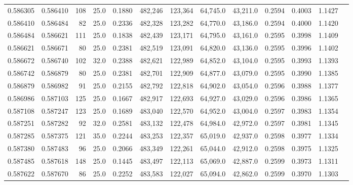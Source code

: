 \begin{tabular}{rrrrrrrrrrrrr}
0.586305 & 0.586410 &   108 & 25.0 &                                     0.1880 & 482,246 & 123,364 &  64,745.0 &  43,211.0 & 0.2594 & 0.4003 & 1.1427 \\
0.586410 & 0.586484 &    82 & 25.0 &                                     0.2336 & 482,328 & 123,282 &  64,770.0 &  43,186.0 & 0.2594 & 0.4000 & 1.1420 \\
0.586484 & 0.586621 &   111 & 25.0 &                                     0.1838 & 482,439 & 123,171 &  64,795.0 &  43,161.0 & 0.2595 & 0.3998 & 1.1409 \\
0.586621 & 0.586671 &    80 & 25.0 &                                     0.2381 & 482,519 & 123,091 &  64,820.0 &  43,136.0 & 0.2595 & 0.3996 & 1.1402 \\
0.586672 & 0.586740 &   102 & 32.0 &                                     0.2388 & 482,621 & 122,989 &  64,852.0 &  43,104.0 & 0.2595 & 0.3993 & 1.1393 \\
0.586742 & 0.586879 &    80 & 25.0 &                                     0.2381 & 482,701 & 122,909 &  64,877.0 &  43,079.0 & 0.2595 & 0.3990 & 1.1385 \\
0.586879 & 0.586982 &    91 & 25.0 &                                     0.2155 & 482,792 & 122,818 &  64,902.0 &  43,054.0 & 0.2596 & 0.3988 & 1.1377 \\
0.586986 & 0.587103 &   125 & 25.0 &                                     0.1667 & 482,917 & 122,693 &  64,927.0 &  43,029.0 & 0.2596 & 0.3986 & 1.1365 \\
0.587108 & 0.587247 &   123 & 25.0 &                                     0.1689 & 483,040 & 122,570 &  64,952.0 &  43,004.0 & 0.2597 & 0.3983 & 1.1354 \\
0.587251 & 0.587282 &    92 & 32.0 &                                     0.2581 & 483,132 & 122,478 &  64,984.0 &  42,972.0 & 0.2597 & 0.3981 & 1.1345 \\
0.587285 & 0.587375 &   121 & 35.0 &                                     0.2244 & 483,253 & 122,357 &  65,019.0 &  42,937.0 & 0.2598 & 0.3977 & 1.1334 \\
0.587380 & 0.587483 &    96 & 25.0 &                                     0.2066 & 483,349 & 122,261 &  65,044.0 &  42,912.0 & 0.2598 & 0.3975 & 1.1325 \\
0.587485 & 0.587618 &   148 & 25.0 &                                     0.1445 & 483,497 & 122,113 &  65,069.0 &  42,887.0 & 0.2599 & 0.3973 & 1.1311 \\
0.587622 & 0.587670 &    86 & 25.0 &                                     0.2252 & 483,583 & 122,027 &  65,094.0 &  42,862.0 & 0.2599 & 0.3970 & 1.1303 \\

\end{tabular}
